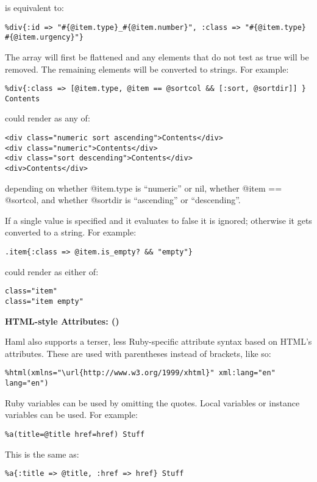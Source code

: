 \documentclass[9pt]{article}
\begin{document}
 is equivalent to:
\begin{verbatim}
%div{:id => "#{@item.type}_#{@item.number}", :class => "#{@item.type} #{@item.urgency}"}
\end{verbatim}


 The array will first be flattened and any elements that do not test as true will be removed. The remaining elements will be converted to strings. For example:
\begin{verbatim}
%div{:class => [@item.type, @item == @sortcol && [:sort, @sortdir]] } Contents
\end{verbatim}


 could render as any of:
\begin{verbatim}
<div class="numeric sort ascending">Contents</div>
<div class="numeric">Contents</div>
<div class="sort descending">Contents</div>
<div>Contents</div>
\end{verbatim}


 depending on whether @item.type is ``numeric'' or nil, whether @item == @sortcol, and whether @sortdir is ``ascending'' or ``descending''.


 If a single value is specified and it evaluates to false it is ignored; otherwise it gets converted to a string. For example:
\begin{verbatim}
.item{:class => @item.is_empty? && "empty"}
\end{verbatim}


 could render as either of:
\begin{verbatim}
class="item"
class="item empty"
\end{verbatim}
\textbf{HTML-style Attributes: ()}


 Haml also supports a terser, less Ruby-specific attribute syntax based on HTML’s attributes. These are used with parentheses instead of brackets, like so:
\begin{verbatim}
%html(xmlns="\url{http://www.w3.org/1999/xhtml}" xml:lang="en" lang="en")
\end{verbatim}


 Ruby variables can be used by omitting the quotes. Local variables or instance variables can be used. For example:
\begin{verbatim}
%a(title=@title href=href) Stuff
\end{verbatim}


 This is the same as:
\begin{verbatim}
%a{:title => @title, :href => href} Stuff
\end{verbatim}
\end{document}
